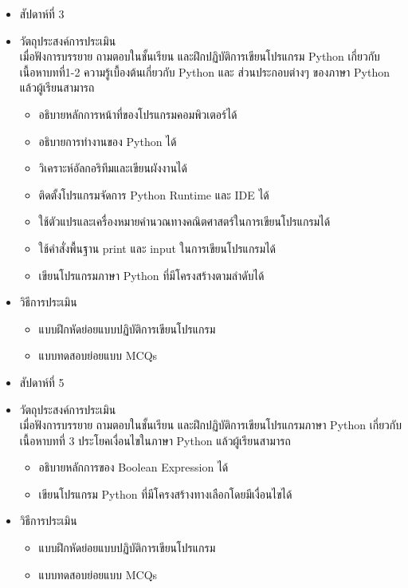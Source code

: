 \begin{tcolorbox}[breakable,enhanced,fonttitle=\bfseries]
\begin{itemize}
\item สัปดาห์ที่ 3
\item วัตถุประสงค์การประเมิน
	\\ เมื่อฟังการบรรยาย ถามตอบในชั้นเรียน และฝึกปฏิบัติการเขียนโปรแกรม Python เกี่ยวกับเนื้อหาบทที่1-2 ความรู้เบื้องต้นเกี่ยวกับ Python และ ส่วนประกอบต่างๆ ของภาษา Python แล้วผู้เรียนสามารถ 
	\begin{itemize}
	\item อธิบายหลักการหน้าที่ของโปรแกรมคอมพิวเตอร์ได้
	\item อธิบายการทำงานของ Python ได้
	\item วิเคราะห์อัลกอริทึมและเขียนผังงานได้
	\item ติดตั้งโปรแกรมจัดการ Python Runtime และ IDE ได้
	\item ใช้ตัวแปรและเครื่องหมายคำนวณทางคณิตศาสตร์ในการเขียนโปรแกรมได้
	\item ใช้คำสั่งพื้นฐาน print และ input ในการเขียนโปรแกรมได้
	\item เขียนโปรแกรมภาษา Python ที่มีโครงสร้างตามลำดับได้
	\end{itemize}
\item วิธีการประเมิน
	\begin{itemize}
	\item แบบฝึกหัดย่อยแบบปฏิบัติการเขียนโปรแกรม
	\item แบบทดสอบย่อยแบบ MCQs
	\end{itemize}
\end{itemize}
\end{tcolorbox}
\vspace{1.5cm}

\begin{tcolorbox}[breakable,enhanced,fonttitle=\bfseries]
\begin{itemize}
\item สัปดาห์ที่ 5
\item วัตถุประสงค์การประเมิน
	\\ เมื่อฟังการบรรยาย ถามตอบในชั้นเรียน และฝึกปฏิบัติการเขียนโปรแกรมภาษา Python เกี่ยวกับเนื้อหาบทที่ 3 ประโยคเงื่อนไขในภาษา Python แล้วผู้เรียนสามารถ
	\begin{itemize}
	\item อธิบายหลักการของ Boolean Expression ได้
	\item เขียนโปรแกรม Python ที่มีโครงสร้างทางเลือกโดยมีเงื่อนไขได้
	\end{itemize}
\item วิธีการประเมิน
	\begin{itemize}
	\item แบบฝึกหัดย่อยแบบปฏิบัติการเขียนโปรแกรม
	\item แบบทดสอบย่อยแบบ MCQs
	\end{itemize}
\end{itemize}
\end{tcolorbox}
\vspace{1.5cm}

